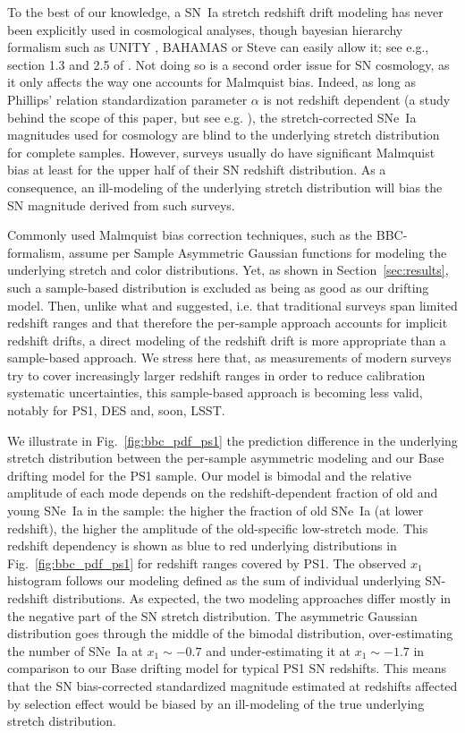 \documentclass[]{aa} %
\begin{document}
To the best of our knowledge, a SN~Ia stretch redshift drift modeling has never
been explicitly used in cosmological analyses, though bayesian hierarchy
formalism such as UNITY \citep{rubin2015}, BAHAMAS \citep{shariff2016} or Steve
\citep{hinton2019} can easily allow it; see e.g., section 1.3 and 2.5 of
\cite{rubin2015}. Not doing so is a second order issue for SN cosmology, as it
only affects the way one accounts for Malmquist bias. Indeed, as long as
Phillips' relation \citep{phillips1993} standardization parameter $\alpha$ is
not redshift dependent (a study behind the scope of this paper, but see e.g.
\citealt{scolnic2018a}), the stretch-corrected SNe~Ia magnitudes used for
cosmology are blind to the underlying stretch distribution for complete samples.
However, surveys usually do have significant Malmquist bias at least for the
upper half of their SN redshift distribution. As a consequence, an ill-modeling
of the underlying stretch distribution will bias the SN magnitude derived from
such surveys. 

Commonly used Malmquist bias correction techniques, such as the BBC-formalism,
assume per Sample Asymmetric Gaussian functions for modeling the underlying
stretch and color distributions. Yet, as shown in Section~\ref{sec:results},
such a sample-based distribution is excluded as being as good as our drifting
model. Then, unlike what \citet[][Section~2]{scolnic2016} and
\citet[][Section~5.4]{scolnic2018a} suggested, i.e. that traditional surveys
span limited redshift ranges and that therefore the per-sample approach accounts
for implicit redshift drifts, a direct modeling of the redshift drift is more
appropriate than a sample-based approach. We stress here that, as measurements
of modern surveys try to cover increasingly larger redshift ranges in order to
reduce calibration systematic uncertainties, this sample-based approach is
becoming less valid, notably for PS1, DES and, soon, LSST.

We illustrate in Fig.~\ref{fig:bbc_pdf_ps1} the prediction difference in the
underlying stretch distribution between the per-sample asymmetric modeling and
our Base drifting model for the PS1 sample. Our model is bimodal and the
relative amplitude of each mode depends on the redshift-dependent fraction of
old and young SNe~Ia in the sample: the higher the fraction of old SNe~Ia (at
lower redshift), the higher the amplitude of the old-specific low-stretch mode.
This redshift dependency is shown as blue to red underlying distributions in
Fig.~\ref{fig:bbc_pdf_ps1} for redshift ranges covered by PS1. The observed
$x_1$ histogram follows our modeling defined as the sum of individual underlying
SN-redshift distributions. As expected, the two modeling approaches differ
mostly in the negative part of the SN stretch distribution. The asymmetric
Gaussian distribution goes through the middle of the bimodal distribution,
over-estimating the number of SNe~Ia at $x_1\sim-0.7$ and under-estimating it at
$x_1\sim-1.7$ in comparison to our Base drifting model for typical PS1 SN
redshifts. This means that the SN bias-corrected standardized magnitude
estimated at redshifts affected by selection effect would be biased by an
ill-modeling of the true underlying stretch distribution.
\end{document}
